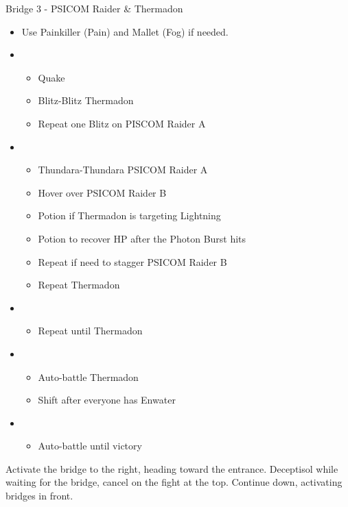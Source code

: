 \begin{battle}{Bridge 3 - PSICOM Raider \& Thermadon}
\begin{itemize}
    \item Use Painkiller (Pain) and Mallet (Fog) if needed.
    \item \first
    \begin{itemize}
        \item Quake
        \item Blitz-Blitz Thermadon
        \item Repeat one Blitz on PISCOM Raider A
    \end{itemize}
    \item \second
    \begin{itemize}
        \item Thundara-Thundara PSICOM Raider A
        \item Hover over PSICOM Raider B
        \item Potion if Thermadon is targeting Lightning
        \item Potion to recover HP after the Photon Burst hits
        \item Repeat if need to stagger PSICOM Raider B
        \item Repeat Thermadon
    \end{itemize}
    \item \fourth
    \begin{itemize}
        \item Repeat until Thermadon \stagger
    \end{itemize}
    \item \first
    \begin{itemize}
        \item Auto-battle Thermadon
        \item Shift after everyone has Enwater
    \end{itemize}
    \item \fifth
    \begin{itemize}
        \item Auto-battle until victory
    \end{itemize}
\end{itemize}
  
\end{battle}

Activate the bridge to the right, heading toward the entrance. Deceptisol while waiting for the bridge, cancel on the fight at the top. Continue down, activating bridges in front.

